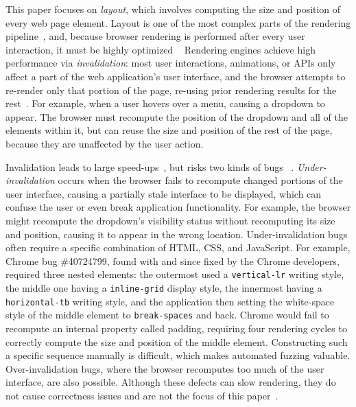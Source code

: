This paper focuses on \emph{layout},
  which involves computing the size and position of every web page element.
Layout is one of the most complex parts of the rendering pipeline~\cite{panchekha2024reusing},
  and, because browser rendering is performed after every user interaction,
  it must be highly optimized%
  ~\cite{megatron,kosaka2018insideBrowserPart3,mdnWebPerformance}
Rendering engines achieve high performance via \emph{invalidation}:
  most user interactions, animations, or APIs only affect
  a part of the web application's user interface,
  and the browser attempts to re-render only that portion of the page,
  re-using prior rendering results for the rest~\cite{panchekha2024reusing}.
For example, when a user hovers over a menu,
  causing a dropdown to appear.
The browser must recompute the position of the dropdown
  and all of the elements within it,
  but can reuse the size and position of the rest of the page,
  because they are unaffected by the user action.

Invalidation leads to large speed-ups~\cite{megatron},
  but risks two kinds of bugs%
  ~\cite{firefoxPerformanceBestPractices,kosaka2018insideBrowserPart3}.
\emph{Under-invalidation} occurs when the browser
  fails to recompute changed portions of the user interface,
  causing a partially stale interface to be displayed,
  which can confuse the user or even break application functionality. 
For example, the browser might recompute
  the dropdown's visibility status without recomputing
  its size and position, causing it to appear in the wrong location.
Under-invalidation bugs often require
  a specific combination of HTML, CSS, and JavaScript.
For example, Chrome bug \#40724799,
  found with \toolname and since fixed by the Chrome developers,
  required three nested elements:
  the outermost used a \texttt{vertical-lr} writing style,
  the middle one having a \texttt{inline-grid} display style,
  the innermost having a \texttt{horizontal-tb} writing style,
  and the application then setting the white-space style
  of the middle element to \texttt{break-spaces} and back.
Chrome would fail to recompute an internal property called padding,
  requiring four rendering cycles
  to correctly compute the size and position of the middle element.
Constructing such a specific sequence manually
  is difficult, which makes automated fuzzing valuable.
Over-invalidation bugs, where the browser recomputes
  too much of the user interface, are also possible.
Although these defects can slow rendering,
  they do not cause correctness issues
  and are not the focus of this paper~\cite{kilpatrick2021layoutng}.


